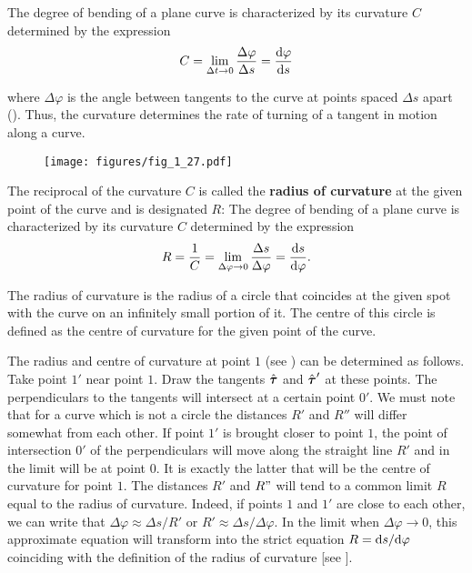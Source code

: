 The degree of bending of a plane curve is characterized by its curvature $C$ determined by the expression
\begin{equation}\label{eq:1_86}
C = \lim_{\Delta t\to 0} \frac{\Delta\varphi}{\Delta s} = \frac{\mathrm{d}\varphi}{\mathrm{d} s}
\end{equation}

\noindent
where $\Delta\varphi$ is the angle between tangents to the curve at points spaced $\Delta s$ apart (). Thus, the curvature determines the rate of turning of a tangent in motion along a curve.

\begin{figure}[t]
	\begin{center}
		\texttt{[image: figures/fig\_1\_27.pdf]}
		\caption[]{}
		\label{fig:1_27}
	\end{center}
	\vspace{-0.7cm}
\end{figure}


The reciprocal of the curvature $C$ is called the \textbf{radius of curvature} at the given point of the curve and is designated $R$:
The degree of bending of a plane curve is characterized by its curvature $C$ determined by the expression
\begin{equation}\label{eq:1_87}
R = \frac{1}{C} = \lim_{\Delta\varphi\to 0} \frac{\Delta s}{\Delta\varphi} = \frac{\mathrm{d} s}{\mathrm{d}\varphi}.
\end{equation}

\noindent
The radius of curvature is the radius of a circle that coincides at the given spot with the curve on an infinitely small portion of it. The centre of this circle is defined as the centre of curvature for the given point of the curve.

The radius and centre of curvature at point $1$ (see ) can be determined as follows. Take point $1'$ near point $1$. Draw the tangents $\hat{\boldsymbol{\tau}}$ and $\hat{\boldsymbol{\tau}}'$ at these points. The perpendiculars to the tangents will intersect at a certain point $0'$. We must note that for a curve which is not a circle the distances $R'$ and $R''$ will differ somewhat from each other. If point $1'$ is brought closer to point $1$, the point of intersection $0'$ of the perpendiculars will move along the straight line $R'$ and in the limit will be at point $0$. It is exactly the latter that will be the centre of curvature for point $1$. The distances $R'$ and $R"$ will tend to a common limit $R$ equal to the radius of curvature. Indeed, if points $1$ and $1'$ are close to each other, we can write that $\Delta\varphi\approx\Delta s/R'$ or $R' \approx \Delta s/\Delta\varphi$. In the limit when $\Delta\varphi\to 0$, this approximate equation will transform into the strict equation $R=\mathrm{d} s/\mathrm{d}\varphi$ coinciding with the definition of the radius of curvature [see ].


